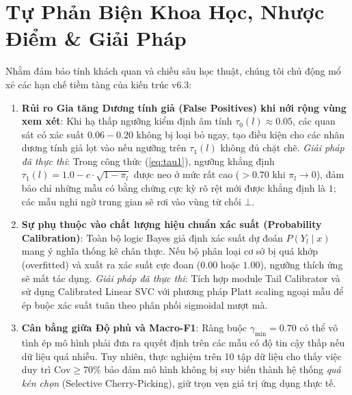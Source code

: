 \documentclass[10pt,a4paper,twoside]{article}
\begin{document}
\section{Tự Phản Biện Khoa Học, Nhược Điểm \& Giải Pháp}
Nhằm đảm bảo tính khách quan và chiều sâu học thuật, chúng tôi chủ động mổ xẻ các hạn chế tiềm tàng của kiến trúc v6.3:
\begin{enumerate}[leftmargin=*]
    \item \textbf{Rủi ro Gia tăng Dương tính giả (False Positives) khi nới rộng vùng xem xét}: Khi hạ thấp ngưỡng kiểm định âm tính $\tau_0(l) \approx 0.05$, các quan sát có xác suất $0.06 - 0.20$ không bị loại bỏ ngay, tạo điều kiện cho các nhãn dương tính giả lọt vào nếu ngưỡng trên $\tau_1(l)$ không đủ chặt chẽ. \textit{Giải pháp đã thực thi}: Trong công thức (\ref{eq:tau1}), ngưỡng khẳng định $\tau_1(l) = 1.0 - c \cdot \sqrt{1 - \pi_l}$ được neo ở mức rất cao ($> 0.70$ khi $\pi_l \to 0$), đảm bảo chỉ những mẫu có bằng chứng cực kỳ rõ rệt mới được khẳng định là $1$; các mẫu nghi ngờ trung gian sẽ rơi vào vùng từ chối $\bot$.
    \item \textbf{Sự phụ thuộc vào chất lượng hiệu chuẩn xác suất (Probability Calibration)}: Toàn bộ logic Bayes giả định xác suất dự đoán $P(Y_l \mid x)$ mang ý nghĩa thống kê chân thực. Nếu bộ phân loại cơ sở bị quá khớp (overfitted) và xuất ra xác suất cực đoan ($0.00$ hoặc $1.00$), ngưỡng thích ứng sẽ mất tác dụng. \textit{Giải pháp đã thực thi}: Tích hợp module Tail Calibrator và sử dụng Calibrated Linear SVC với phương pháp Platt scaling ngoại mẫu để ép buộc xác suất tuân theo phân phối sigmoidal mượt mà.
    \item \textbf{Cân bằng giữa Độ phủ và Macro-F1}: Ràng buộc $\gamma_{\min} = 0.70$ có thể vô tình ép mô hình phải đưa ra quyết định trên các mẫu có độ tin cậy thấp nếu dữ liệu quá nhiễu. Tuy nhiên, thực nghiệm trên 10 tập dữ liệu cho thấy việc duy trì $\text{Cov} \ge 70\%$ bảo đảm mô hình không bị suy biến thành hệ thống \textit{quá kén chọn} (Selective Cherry-Picking), giữ trọn vẹn giá trị ứng dụng thực tế.
\end{enumerate}
\end{document}
